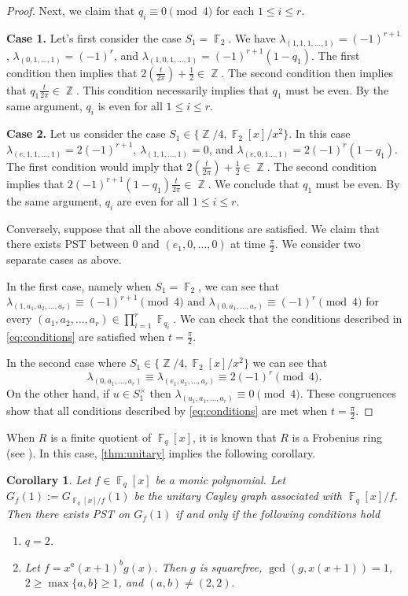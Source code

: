 \documentclass[12pt, a4paper]{amsart}
\newtheorem{cor}[thm]{Corollary}
\theoremstyle{definition}
\DeclareMathOperator{\Z}{\mathbb{Z}}
\DeclareMathOperator{\F}{\mathbb{F}}
\numberwithin{equation}{section}
\begin{document}
\begin{proof}
Next, we claim that $q_i \equiv 0 \pmod{4}$ for each $1 \leq i \leq r.$

\textbf{Case 1.} Let's first consider the case $S_1=\F_2.$ We have $\lambda_{(1, 1, 1,\ldots, 1)}=(-1)^{r+1}$,  $\lambda_{(0,1,\ldots, 1)} =(-1)^r$, and $\lambda_{(1, 0, 1, \ldots, 1)}=(-1)^{r+1}(1-q_1).$ The first condition then implies that $2(\frac{t}{2 \pi})+\frac{1}{2} \in \Z.$ The second condition then implies that $q_1 \frac{t}{2 \pi} \in \Z.$ This condition necessarily implies that $q_1$ must be even. By the same argument, $q_i$ is even for all $1 \leq i \leq r.$

\textbf{Case 2.} Let us consider the case $S_1 \in \{\Z/4, \F_2[x]/x^2 \}.$ In this case $\lambda_{(e, 1, 1,\ldots, 1)}=2(-1)^{r+1}$, $\lambda_{(1,1,\ldots, 1)}=0$,  and $\lambda_{(e,0,1\ldots,1)}= 2(-1)^r (1-q_1).$ The first condition would imply that $2(\frac{t}{2 \pi})+\frac{1}{2} \in \Z.$ The second condition implies that $2(-1)^{r+1}(1-q_1) \frac{t}{2 \pi} \in \Z. $ We conclude that $q_1$ must be even. By the same argument, $q_i$ are even for all $1 \leq i \leq r.$



Conversely, suppose that all the above conditions are satisfied. We claim that there exists PST between $0$ and $(e_1, 0, \ldots, 0)$ at time $\frac{\pi}{2}.$ We consider two separate cases as above. 

In the first case, namely when $S_1 = \F_2$, we can see that $\lambda_{(1,a_1, a_2, \ldots, a_r)} \equiv (-1)^{r+1} \pmod{4}$ and $\lambda_{(0, a_1, \ldots, a_r)} \equiv (-1)^r \pmod{4}$ for every $(a_1, a_2, \ldots, a_r) \in \prod_{i=1}^r \F_{q_i}.$ We can check that the conditions described in \cref{eq:conditions} are satisfied when $t = \frac{\pi}{2}.$


In the second case where $S_1 \in \{\Z/4, \F_2[x]/x^2\}$ we can see that 
\[ \lambda_{(0,a_1, \ldots, a_r)} \equiv \lambda_{(e_1, a_1, \ldots, a_r)} \equiv 2(-1)^r \pmod{4} .\] 
On the other hand, if $u \in S_1^{\times}$ then $\lambda_{(u_1, a_1, \ldots, a_r)} \equiv 0 \pmod{4}$. These congruences show that all conditions described by \cref{eq:conditions} are met when $t = \frac{\pi}{2}.$
\end{proof}

When $R$ is a finite quotient of $\F_q[x]$, it is known that $R$ is a Frobenius ring (see \cite[Corollary 6.8]{minavc2024gcd}). In this case, \cref{thm:unitary} implies the following  corollary. 

\begin{cor}
    Let $f \in \F_q[x]$ be a monic polynomial. Let $G_{f}(1):=G_{\F_q[x]/f}(1)$ be the unitary Cayley graph associated with $\F_q[x]/f.$ Then there exists PST on $G_{f}(1)$ if and only if the following conditions hold 
    \begin{enumerate}
        \item $q=2$.
        \item Let $f=x^a (x+1)^b g(x)$. Then $g$ is squarefree, $\gcd(g, x(x+1))=1$, $2 \geq \max\{a,b\} \geq 1$, and $(a,b) \neq (2,2).$
    \end{enumerate}
\end{cor}
\end{document}
